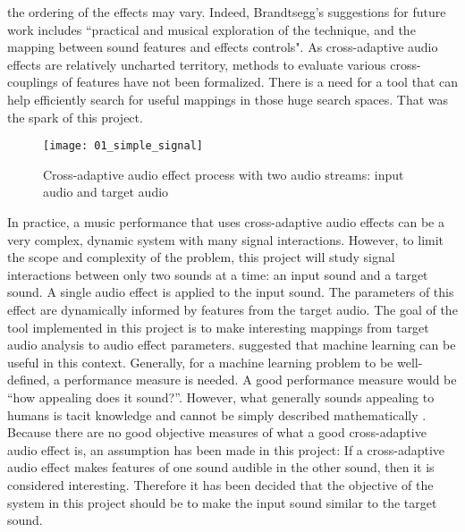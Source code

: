 the ordering of the effects may vary. Indeed, Brandtsegg's suggestions for future work includes ``practical and musical exploration of the technique, and the mapping between sound features and effects controls". As cross-adaptive audio effects are relatively uncharted territory, methods to evaluate various cross-couplings of features have not been formalized. There is a need for a tool that can help efficiently search for useful mappings in those huge search spaces. That was the spark of this project.

\begin{figure}[h]
    \centering
    \texttt{[image: 01\_simple\_signal]}
    \caption{Cross-adaptive audio effect process with two audio streams: input audio and target audio}
    \label{fig:simple_signal}
\end{figure}

In practice, a music performance that uses cross-adaptive audio effects can be a very complex, dynamic system with many signal interactions. However, to limit the scope and complexity of the problem, this project will study signal interactions between only two sounds at a time: an input sound and a target sound. A single audio effect is applied to the input sound. The parameters of this effect are dynamically informed by features from the target audio. The goal of the tool implemented in this project is to make interesting mappings from target audio analysis to audio effect parameters. \cite{brandtsegg2015} suggested that machine learning can be useful in this context. Generally, for a machine learning problem to be well-defined, a performance measure is needed. A good performance measure would be “how appealing does it sound?”. However, what generally sounds appealing to humans is tacit knowledge and cannot be simply described mathematically \citep{schmidhuber2009}. Because there are no good objective measures of what a good cross-adaptive audio effect is, an assumption has been made in this project: If a cross-adaptive audio effect makes features of one sound audible in the other sound, then it is considered interesting. Therefore it has been decided that the objective of the system in this project should be to make the input sound similar to the target sound.

